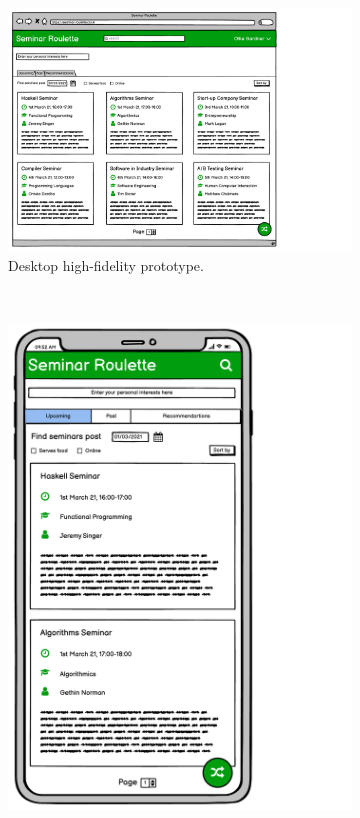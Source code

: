 \documentclass{l4proj}
\begin{document}
\begin{figure}[htb] 
    \centering
    \begin{subfigure}[b]{0.65\textwidth}
        \includegraphics[width=\textwidth]{images/desktop_prototype.pdf}
        \caption{Desktop high-fidelity prototype.}
        \label{fig:desktop_prototype}
    \end{subfigure}
    ~
    \begin{subfigure}[b]{0.3\textwidth}
        \includegraphics[width=\textwidth]{images/mobile_prototype.pdf}

\end{subfigure}
\end{figure}
\end{document}
